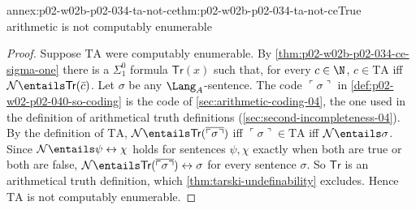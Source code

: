 \begin{annexitem}{annex:p02-w02b-p02-034-ta-not-ce}{thm:p02-w02b-p02-034-ta-not-ce}{True arithmetic is not computably enumerable}
\begin{proof}
Suppose \(\mathrm{TA}\) were computably enumerable.  By
\cref{thm:p02-w02b-p02-034-ce-sigma-one} there is a \(\Sigma^0_1\) formula
\(\mathsf{Tr}(x)\) such that, for every \(c\in\N\), \(c\in\mathrm{TA}\) iff
\(\mathcal N\entails\mathsf{Tr}(\bar c)\).  Let \(\sigma\) be any
\(\Lang_A\)-sentence.  The code \(\ulcorner\sigma\urcorner\) in
\cref{def:p02-w02-p02-040-so-coding} is the code of
\cref{sec:arithmetic-coding-04}, the one used in the definition of
arithmetical truth definitions (\cref{sec:second-incompleteness-04}).  By the
definition of \(\mathrm{TA}\),
\(\mathcal N\entails\mathsf{Tr}(\overline{\ulcorner\sigma\urcorner})\) iff
\(\ulcorner\sigma\urcorner\in\mathrm{TA}\) iff \(\mathcal N\entails\sigma\).
Since \(\mathcal N\entails\psi\leftrightarrow\chi\) holds for sentences
\(\psi,\chi\) exactly when both are true or both are false,
\(\mathcal N\entails\mathsf{Tr}(\overline{\ulcorner\sigma\urcorner})\leftrightarrow\sigma\)
for every sentence \(\sigma\).  So \(\mathsf{Tr}\) is an arithmetical truth
definition, which \cref{thm:tarski-undefinability} excludes.  Hence
\(\mathrm{TA}\) is not computably enumerable.
\end{proof}
\end{annexitem}

